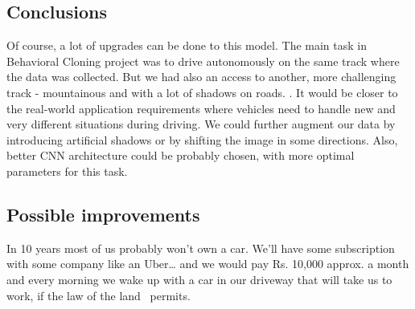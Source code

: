 \subsection{Conclusions}
Of course, a lot of upgrades can be done to this model. The main task in Behavioral Cloning project was to drive autonomously on the same track where the data was collected. But we had also an access to another, more challenging track - mountainous and with a lot of shadows on roads. . It would be closer to the real-world application requirements where vehicles need to handle new and very different situations during driving. We could further augment our data by introducing artificial shadows or by shifting the image in some directions. Also, better CNN architecture could be probably chosen, with more optimal parameters for this task.
	
\subsection{Possible improvements}
	
In 10 years most of us probably won’t own a car. We’ll have some subscription with some company like an Uber… and we would pay Rs. 10,000 approx. a month and every morning we wake up with a car in our driveway that will take us to work, if the law of the land~\cite{arentz2017driving} permits.\\
\newpage